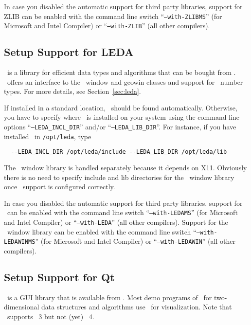 In case you disabled the automatic support for third party libraries,
support for ZLIB can be enabled with the command line switch
``\texttt{--with-ZLIBMS}'' (for Microsoft and Intel Compiler) or
``\texttt{--with-ZLIB}'' (all other compilers).

\subsection{Setup Support for LEDA\label{sec:leda-setup}}

\leda\ is a library for efficient data types and algorithms that can
be bought from \ledapage. \cgal\ offers an interface to the \leda\
window and geowin classes and support for \leda\ number types. For
more details, see Section~\ref{sec:leda}.

If installed in a standard location, \leda\ should be found
automatically. Otherwise, you have to specify where \leda\ is
installed on your system using the command line options
``\texttt{--LEDA\_INCL\_DIR}'' and/or ``\texttt{--LEDA\_LIB\_DIR}''.
For instance, if you have installed \leda\ in \texttt{/opt/leda}, type
\begin{verbatim}
  --LEDA_INCL_DIR /opt/leda/include --LEDA_LIB_DIR /opt/leda/lib
\end{verbatim}

The \leda\ window library is handled separately because it depends on
X11. Obviously there is no need to specify include and lib directories
for the \leda\ window library once \leda\ support is configured
correctly.

In case you disabled the automatic support for third party libraries,
support for \leda\ can be enabled with the command line switch
``\texttt{--with-LEDAMS}'' (for Microsoft and Intel Compiler) or
``\texttt{--with-LEDA}'' (all other compilers). Support for the \leda\
window library can be enabled with the command line switch
``\texttt{--with-LEDAWINMS}'' (for Microsoft and Intel Compiler) or
``\texttt{--with-LEDAWIN}'' (all other compilers).

\subsection{Setup Support for Qt\label{sec:qt-setup}}

\qt\ is a GUI library that is available from \qtpage. Most demo
programs of \cgal\ for two-dimensional data structures and algorithms
use \qt\ for visualization. Note that \cgal\ supports \qt~3 but not
(yet) \qt~4.

